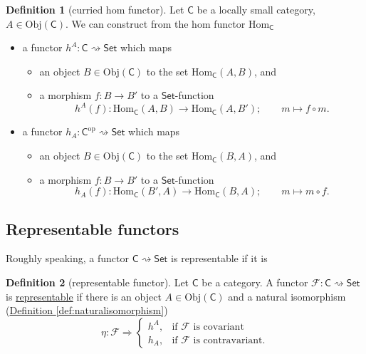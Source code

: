 \documentclass[a4paper,10pt]{scrreprt}
\newcommand{\defn}[1]{\ul{#1}}
\newcommand{\Obj}{\mathrm{Obj}}
\newcommand{\Hom}{\mathrm{Hom}}
\theoremstyle{definition}
\newtheorem{definition}{Definition}[section]
\theoremstyle{plain}
\theoremstyle{remark}
\begin{document}
\begin{definition}[curried hom functor]
  \label{def:curriedhomfunctor}
  Let $\mathsf{C}$ be a locally small category, $A \in \Obj(\mathsf{C})$. We can construct from the hom functor $\Hom_{\mathsf{C}}$
  \begin{itemize}
    \item a functor $h^{A}\colon \mathsf{C} \rightsquigarrow \mathsf{Set}$ which maps
      \begin{itemize}
        \item an object $B \in \Obj(\mathsf{C})$ to the set $\Hom_{\mathsf{C}}(A, B)$, and

        \item a morphism $f\colon B \to B'$ to a $\mathsf{Set}$-function
          \begin{equation*}
            h^{A}(f)\colon \Hom_{\mathsf{C}}(A, B) \to \Hom_{\mathsf{C}}(A, B'); \qquad m \mapsto f \circ m.
          \end{equation*} 
      \end{itemize}

    \item a functor $h_{A}\colon \mathsf{C}^{\mathrm{op}} \rightsquigarrow \mathsf{Set}$ which maps
      \begin{itemize}
        \item an object $B \in \Obj(\mathsf{C})$ to the set $\Hom_{\mathsf{C}}(B, A)$, and

        \item a morphism $f\colon B \to B'$ to a $\mathsf{Set}$-function
          \begin{equation*}
            h_{A}(f)\colon \Hom_{\mathsf{C}}(B', A) \to \Hom_{\mathsf{C}}(B, A); \qquad m \mapsto m \circ f.
          \end{equation*} 
      \end{itemize}
  \end{itemize}
\end{definition}

\subsection{Representable functors}
Roughly speaking, a functor $\mathsf{C} \rightsquigarrow \mathsf{Set}$ is representable if it is 

\begin{definition}[representable functor]
  \label{def:representablefunctor}
  Let $\mathsf{C}$ be a category. A functor $\mathcal{F}\colon \mathsf{C} \rightsquigarrow \mathsf{Set}$ is \defn{representable} if there is an object $A \in \Obj(\mathsf{C})$ and a natural isomorphism (\hyperref[def:naturalisomorphism]{Definition \ref*{def:naturalisomorphism}})
  \begin{equation*}
    \eta\colon \mathcal{F} \Rightarrow 
    \begin{cases}
      h^{A}, & \text{if $\mathcal{F}$ is covariant} \\
      h_{A}, & \text{if $\mathcal{F}$ is contravariant.}
    \end{cases}
  \end{equation*}
\end{definition}
\end{document}
